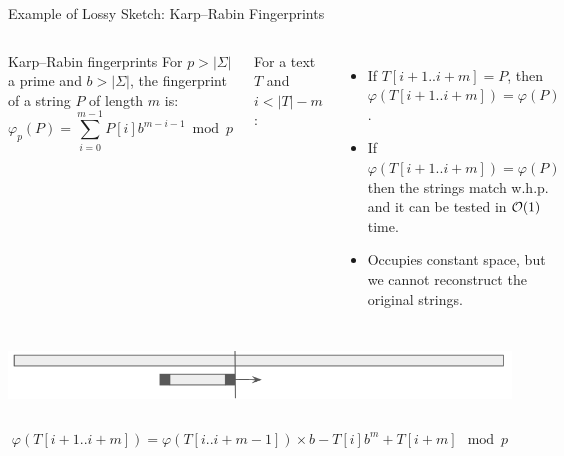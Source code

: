 \begin{frame}{Example of Lossy Sketch: Karp--Rabin Fingerprints}
    \begin{columns}
        \begin{mydefblock}{Karp--Rabin fingerprints}
            For $p>|\Sigma|$ a prime and $b > |\Sigma|$,
            the fingerprint of a string $P$ of length $m$ is:
            $$\varphi_{p}(P) = \sum_{i = 0}^{m-1}  P[i]b^{m-i-1} \bmod p$$
        \end{mydefblock}
        \pause
        
        For a text $T$ and $i < |T|-m$:\\
        \begin{itemize}
            \item If $T[i+1..i+m]=P$, then $\varphi(T[i+1..i+m])=\varphi(P)$.\pause
            \item If $\varphi(T[i+1..i+m])=\varphi(P)$ then the strings match w.h.p. and it can be tested in $\mathcal{O}(1)$ time.\pause
            \item Occupies constant space, but we cannot reconstruct the original strings.\pause
        \end{itemize}
    \end{columns}

    \bigskip
    \begin{columns}
    \includegraphics[width=\textwidth]{pictures/slidding_window.png}
    \end{columns}\pause
    $$ \varphi(T[i+1..i+m]) = \varphi(T[i..i+m-1])\times b - T[i]b^m + T[i+m] \mod p$$\vspace{-0.5cm}
\end{frame}

